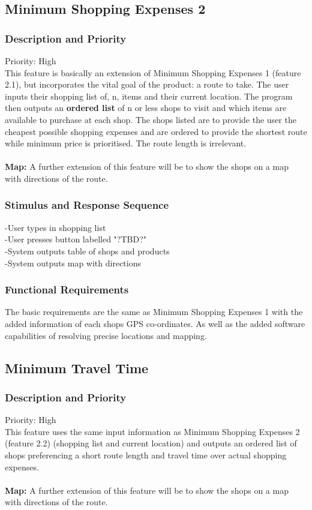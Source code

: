 \documentclass[12pt]{article}
\begin{document}
 \subsection{Minimum Shopping Expenses 2}
\subsubsection{Description and Priority}
 Priority: High\\
 This feature is basically an extension of Minimum Shopping Expenses 1 (feature 2.1), but incorporates the vital goal of the product: a route to take. The user inputs their shopping list of, n, items and their current location. The program then outputs an \textbf{ordered list} of n or less shops to visit and which items are available to purchase at each shop. The shops listed are to provide the user the cheapest possible shopping expenses and are ordered to provide the shortest route while minimum price is prioritised. The route length is irrelevant. 
\\\\
\textbf{Map:} A further extension of this feature will be to show the shops on a map with directions of the route.
 \subsubsection{Stimulus and Response Sequence}
-User types in shopping list\\
-User presses button labelled "?TBD?"\\
-System outputs table of shops and products\\
-System outputs map with directions\\
 \subsubsection{Functional Requirements}
 The basic requirements are the same as Minimum Shopping Expenses 1 with the added information of each shops GPS co-ordinates. As well as the added software capabilities of resolving precise locations and mapping.
 
 \subsection{Minimum Travel Time}
\subsubsection{Description and Priority}
 Priority: High\\
 This feature uses the same input information as Minimum Shopping Expenses 2 (feature 2.2) (shopping list and current location) and outputs an ordered list of shops preferencing a short route length and travel time over actual shopping expenses.  
\\\\
\textbf{Map:} A further extension of this feature will be to show the shops on a map with directions of the route.
\end{document}
